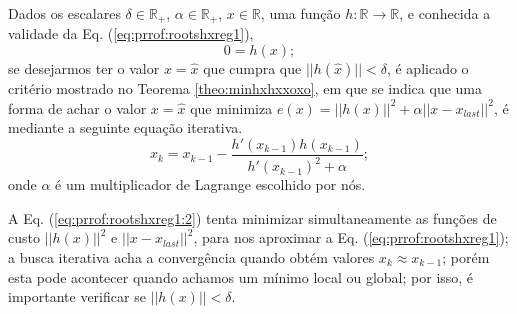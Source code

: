 \begin{myproofT}\label{proof:theo:rootshxreg}
Dados
os escalares $\delta \in \mathbb{R}_+$,
$\alpha \in \mathbb{R}_+$, 
$x \in \mathbb{R}$, 
uma função $h:\mathbb{R} \rightarrow \mathbb{R}$, e 
conhecida a validade da Eq. (\ref{eq:prrof:rootshxreg1}),
\begin{equation}\label{eq:prrof:rootshxreg1}
0=h(x);
\end{equation}
se desejarmos ter o valor $x=\hat{x}$ que cumpra que $||h(\hat{x})||<\delta$, 
é aplicado o critério mostrado no Teorema \ref{theo:minhxhxxoxo},
em que se indica que uma forma de achar o valor 
$x=\hat{x}$ que minimiza $e(x)=||h(x)||^2+\alpha||x-x_{last}||^2$, 
é mediante a seguinte equação iterativa.  
\begin{equation}\label{eq:prrof:rootshxreg1:2}
x_{k}=x_{k-1}-\frac{h'(x_{k-1}) h(x_{k-1})}{h'(x_{k-1})^2+\alpha};
\end{equation}
onde $\alpha$ é um multiplicador de Lagrange escolhido por nós.

A Eq. (\ref{eq:prrof:rootshxreg1:2}) tenta minimizar simultaneamente 
as funções de custo $||h(x)||^2$ 
e $||x-x_{last}||^2$, para nos aproximar a Eq. (\ref{eq:prrof:rootshxreg1});
a busca iterativa acha a convergência quando obtém valores $x_{k}\approx x_{k-1}$;
porém esta pode acontecer quando achamos um mínimo local ou global;
por isso, é importante verificar se $||h(x)||<\delta$. 
\end{myproofT}
